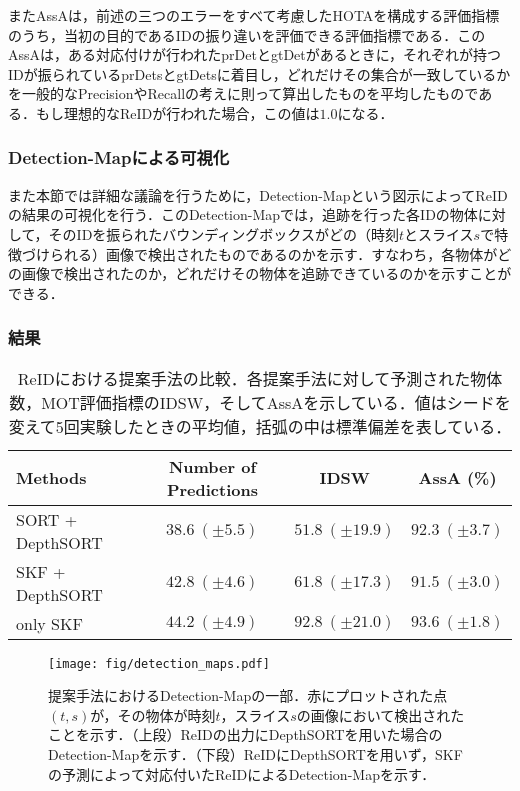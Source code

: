         またAssA\cite{luiten2021hota}は，前述の三つのエラーをすべて考慮したHOTAを構成する評価指標のうち，当初の目的であるIDの振り違いを評価できる評価指標である．このAssAは，ある対応付けが行われたprDetとgtDetがあるときに，それぞれが持つIDが振られているprDetsとgtDetsに着目し，どれだけその集合が一致しているかを一般的なPrecisionやRecallの考えに則って算出したものを平均したものである．もし理想的なReIDが行われた場合，この値は$1.0$になる．

        \subsubsection{Detection-Mapによる可視化}

        また本節では詳細な議論を行うために，Detection-Mapという図示によってReIDの結果の可視化を行う．このDetection-Mapでは，追跡を行った各IDの物体に対して，そのIDを振られたバウンディングボックスがどの（時刻$t$とスライス$s$で特徴づけられる）画像で検出されたものであるのかを示す．すなわち，各物体がどの画像で検出されたのか，どれだけその物体を追跡できているのかを示すことができる．

        \subsubsection{結果}

        \begin{table}[t]
            \centering
            \caption[ReIDにおける提案手法の比較]{ReIDにおける提案手法の比較．各提案手法に対して予測された物体数，MOT評価指標のIDSW，そしてAssAを示している．値はシードを変えて5回実験したときの平均値，括弧の中は標準偏差を表している．}
            \label{tab:metrics_reidentification}
            \begin{tabular}{l|ccc}
                Methods & Number of Predictions & IDSW & AssA (\%)
                \\\hline \hline
                SORT + DepthSORT & $38.6 ~ (\pm 5.5)$ & $51.8 ~ (\pm 19.9)$ & $92.3 ~ (\pm 3.7)$
                \\ SKF + DepthSORT & $42.8 ~ (\pm 4.6)$ & $61.8 ~ (\pm 17.3)$ & $91.5 ~ (\pm 3.0)$
                \\ only SKF & $44.2 ~ (\pm 4.9)$ & $92.8 ~ (\pm 21.0)$ & $93.6 ~ (\pm 1.8)$
            \end{tabular}
        \end{table}

        \begin{figure}[t]
            \centering
            \texttt{[image: fig/detection\_maps.pdf]}
            \caption[提案手法におけるDetection-Mapの一部]{提案手法におけるDetection-Mapの一部．赤にプロットされた点$(t, s)$が，その物体が時刻$t$，スライス$s$の画像において検出されたことを示す．（上段）ReIDの出力にDepthSORTを用いた場合のDetection-Mapを示す．（下段）ReIDにDepthSORTを用いず，SKFの予測によって対応付いたReIDによるDetection-Mapを示す．}
            \label{fig:detection_map}
        \end{figure}

